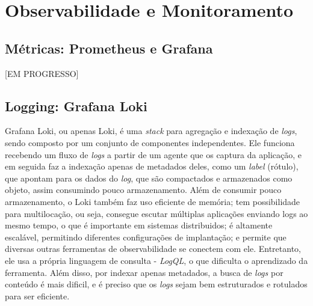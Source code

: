 


\section{Observabilidade e Monitoramento}

\subsection{Métricas: Prometheus e Grafana}
[EM PROGRESSO]

\subsection{Logging: Grafana Loki}
Grafana Loki, ou apenas Loki, é uma \emph{stack} para agregação e indexação de \emph{logs}, sendo composto por um conjunto de componentes independentes. Ele funciona recebendo um fluxo de \emph{logs} a partir de um agente que os captura da aplicação, e em seguida faz a indexação apenas de metadados deles, como um \emph{label} (rótulo), que apontam para os dados do \emph{log}, que são compactados e armazenados como objeto, assim consumindo pouco armazenamento. Além de consumir pouco armazenamento, o Loki também faz uso eficiente de memória; tem possibilidade para multilocação, ou seja, consegue escutar múltiplas aplicações enviando logs ao mesmo tempo, o que é importante em sistemas distribuidos; é altamente escalável, permitindo diferentes configurações de implantação; e permite que diversas outras ferramentas de observabilidade se conectem com ele. Entretanto, ele usa a própria linguagem de consulta - \emph{LogQL}, o que dificulta o aprendizado da ferramenta. Além disso, por indexar apenas metadados, a busca de \emph{logs} por conteúdo é mais dificil, e é preciso que os \emph{logs} sejam bem estruturados e rotulados para ser eficiente. \cite{grafana-loki}

